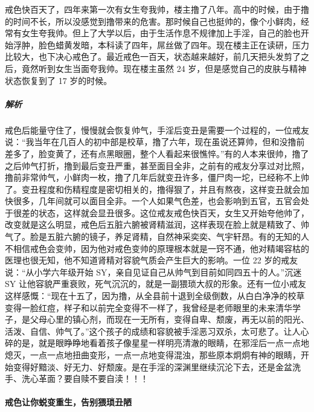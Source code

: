 \begin{case}
    戒色快百天了，四年来第一次有女生夸我帅，楼主撸了八年。高中的时候，由于撸的时间不长，所以没感觉到撸带来的危害。那时候自己也挺帅的，像个小鲜肉，经常有女生夸我帅。但上了大学以后，由于生活作息不规律加上手淫，自己的脸也开始浮肿，脸色蜡黄发暗，本科读了四年，屌丝做了四年。现在楼主正在读研，压力比较大，也下决心戒色了。最近戒色一百天，状态越来越好，前几天把头发剪了之后，竟然听到女生当面夸我帅。现在楼主虽然 24 岁，但是感觉自己的皮肤与精神状态恢复到了 17 岁的时候。
    \subparagraph{解析} 戒色后能量守住了，慢慢就会恢复帅气，手淫后变丑是需要一个过程的，一位戒友说：“我当年在几百人的初中部是校草，撸了六年，现在虽说还算帅，但和没撸前差多了，脸变黄了，还有点黑眼圈，整个人看起来很憔悴。”有的人本来很帅，撸了之后帅气打折，撸到最后变丑严重，甚至面目全非，之前有的戒友分享过对比照，撸前非常帅气，小鲜肉一枚，撸了几年后就变丑许多，僵尸肉一坨，已经称不上帅了。变丑程度和伤精程度是密切相关的，撸得狠了，并且有熬夜，这样变丑就会加快很多，几年间就可以面目全非。一个人如果气色差，也会影响到五官，五官会处于很差的状态，这样就会显丑很多。这位戒友戒色快百天，女生又开始夸他帅了，改变就是这么明显，戒色后五脏六腑被肾精滋润，这样表现在脸上就是精致了、帅气了。脸是五脏六腑的镜子，养足肾精，自然神采奕奕、气宇轩昂。有的无知的人不相信戒色会变帅，因为他对戒色变帅的原理根本就是一窍不通，他对精竭容枯的医理也很无知，他不知道肾精对容貌气质会产生巨大的影响。一位 22 岁的戒友说：“从小学六年级开始 SY，亲自见证自己从帅气到目前如同四五十的人。”沉迷 SY 让他容貌严重衰败，死气沉沉的，就是一副猥琐大叔的形象。还有一位小戒友这样感慨：“现在十五了，因为撸，从全县前十退到全级倒数，从白白净净的校草变得一脸红痘，样子和以前完全变得不一样了，我曾经是老师眼里的未来清华学子，是父母心里的镇心剂，而现在一无所有，变得自卑、颓废，再无以前的阳光、活泼、自信、帅气了。”这个孩子的成绩和容貌被手淫恶习双杀，太可悲了。让人心碎的是，就是眼睁睁地看着孩子像星星一样明亮清澈的眼睛，在邪淫后一点一点地熄灭，一点一点地扭曲变形，一点一点地变得混浊，那些原本炯炯有神的眼睛，开始变得好黯淡、好无力、好颓废。是在手淫的深渊里继续沉沦下去，还是金盆洗手、洗心革面？要自赎不要自渎！！！
\end{case}

\paragraph{戒色让你蜕变重生，告别猥琐丑陋}

